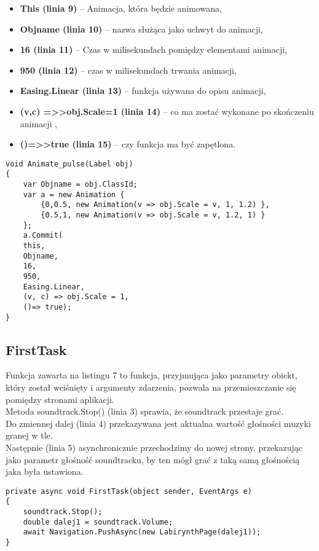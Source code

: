 \begin{itemize}
	\item \textbf{  This (linia 9) } – Animacja, która będzie animowana,   
	\item \textbf{  Objname (linia 10) } – nazwa służąca jako uchwyt do animacji,  
	\item \textbf{  16 (linia 11) } – Czas w milisekundach pomiędzy elementami animacji,  
	\item \textbf{  950 (linia 12) } – czas w milisekundach trwania animacji,   
	\item \textbf{  Easing.Linear (linia 13) } – funkcja używana do opisu animacji, 
	\item \textbf{  (v,c) =>>obj.Scale=1 (linia 14) } – co ma zostać wykonane po skończeniu animacji ,  
	\item \textbf{  ()=>>true (linia 15) } – czy funkcja ma być zapętlona.   
\end{itemize}

\begin{lstlisting}[caption=Animate\_pulse]
void Animate_pulse(Label obj)
{
	var Objname = obj.ClassId;
	var a = new Animation {
		{0,0.5, new Animation(v => obj.Scale = v, 1, 1.2) },
		{0.5,1, new Animation(v => obj.Scale = v, 1.2, 1) }
	};
	a.Commit(
	this,
	Objname,
	16,
	950,
	Easing.Linear, 
	(v, c) => obj.Scale = 1,
	()=> true);
}
\end{lstlisting}

\subsection{FirstTask}
Funkcja zawarta na listingu 7 to funkcja, przyjmująca jako parametry obiekt, który został wciśnięty i argumenty zdarzenia, pozwala na przemieszczanie się pomiędzy stronami aplikacji.
\\
Metoda soundtrack.Stop() (linia 3) sprawia, że soundtrack przestaje grać.
\\
Do zmiennej dalej (linia 4) przekazywana jest aktualna wartość głośności muzyki granej w tle.
\\
Następnie (linia 5) asynchronicznie przechodzimy do nowej strony, przekazując jako parametr głośność soundtracku, by ten mógł grać z taką samą głośnością jaka była ustawiona.

\begin{lstlisting}[caption=FirstTask]
private async void FirstTask(object sender, EventArgs e)
{
	soundtrack.Stop();
	double dalej1 = soundtrack.Volume;
	await Navigation.PushAsync(new LabirynthPage(dalej1));
}
\end{lstlisting}

